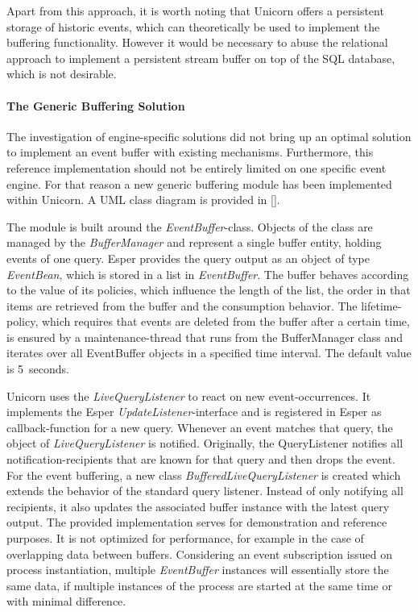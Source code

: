 Apart from this approach, it is worth noting that Unicorn offers a persistent storage of historic events, which can theoretically be used to implement the buffering functionality.
However it would be necessary to abuse the relational approach to implement a persistent stream buffer on top of the SQL database, which is not desirable.

\paragraph{The Generic Buffering Solution}
The investigation of engine-specific solutions did not bring up an optimal solution to implement an event buffer with existing mechanisms.
Furthermore, this reference implementation should not be entirely limited on one specific event engine.
For that reason a new generic buffering module has been implemented within Unicorn. A \acs{UML} class diagram is provided in \autoref{}.


The module is built around the \textit{EventBuffer}-class. Objects of the class are managed by the \textit{BufferManager} and represent a single buffer entity, holding events of one query. Esper provides the query output as an object of type \textit{EventBean}, which is stored in a list in \textit{EventBuffer}.
The buffer behaves according to the value of its policies, which influence the length of the list, the order in that items are retrieved from the buffer and the consumption behavior.
The lifetime-policy, which requires that events are deleted from the buffer after a certain time, is ensured by a maintenance-thread that runs from the BufferManager class and iterates over all EventBuffer objects in a specified time interval. The default value is 5~seconds.

Unicorn uses the \textit{LiveQueryListener} to react on new event-occurrences. It implements the Esper \textit{UpdateListener}-interface and is registered in Esper as callback-function for a new query. Whenever an event matches that query, the object of \textit{LiveQueryListener} is notified.
Originally, the QueryListener notifies all notification-recipients that are known for that query and then drops the event.
For the event buffering, a new class \textit{BufferedLiveQueryListener} is created which extends the behavior of the standard query listener. Instead of only notifying all recipients, it also updates the associated buffer instance with the latest query output.
The provided implementation serves for demonstration and reference purposes. It is not optimized for performance, for example in the case of overlapping data between buffers. Considering an event subscription issued on process instantiation, multiple \textit{EventBuffer} instances will essentially store the same data, if multiple instances of the process are started at the same time or with minimal difference.

